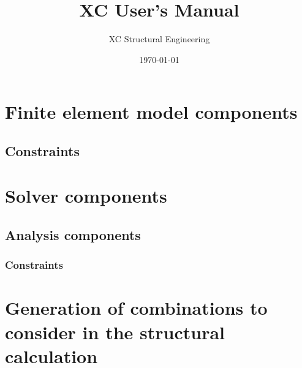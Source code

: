 \documentclass[a4paper,twoside]{book}
\title{XC User's Manual}
\author{XC Structural Engineering}
\date{\today}
\begin{document}
\maketitle
\lstset{language=Python}          %
\setcounter{secnumdepth}{4}
\setcounter{tocdepth}{4}
\tableofcontents
\listoftables


\chapter{Finite element model components}



\section{Constraints}


\chapter{Solver components}

\section{Analysis components}
\subsection{Constraints}








%



\appendix
\chapter{Generation of combinations to consider in the structural calculation}



\begin{thebibliography}{77}	%
\small				%

\end{thebibliography}
\end{document}
